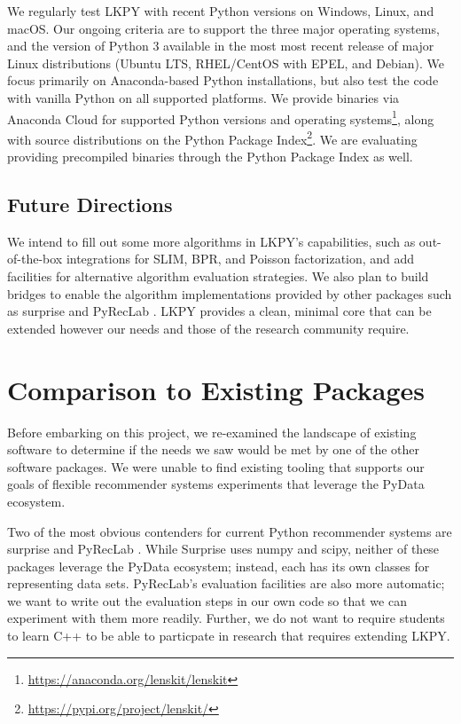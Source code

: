 We regularly test LKPY with recent Python versions on Windows, Linux, and macOS.
Our ongoing criteria are to support the three major operating systems, and the version of Python 3 available in the most most recent release of major Linux distributions (Ubuntu LTS, RHEL/CentOS with EPEL, and Debian).
We focus primarily on Anaconda-based Python installations, but also test the code with vanilla Python on all supported platforms.
We provide binaries via Anaconda Cloud for supported Python versions and operating systems\footnote{\url{https://anaconda.org/lenskit/lenskit}}, along with source distributions on the Python Package Index\footnote{\url{https://pypi.org/project/lenskit/}}.
We are evaluating providing precompiled binaries through the Python Package Index as well.

\subsection{Future Directions}

We intend to fill out some more algorithms in LKPY's capabilities, such as out-of-the-box integrations for SLIM, BPR, and Poisson factorization, and add facilities for alternative algorithm evaluation strategies.
We also plan to build bridges to enable the algorithm implementations provided by other packages such as surprise \citep{Surprise} and PyRecLab \citep{Sepulveda2017-ma}.
LKPY provides a clean, minimal core that can be extended however our needs and those of the research community require.

\section{Comparison to Existing Packages}

Before embarking on this project, we re-examined the landscape of existing software to determine if the needs we saw would be met by one of the other software packages.
We were unable to find existing tooling that supports our goals of flexible recommender systems experiments that leverage the PyData ecosystem.

Two of the most obvious contenders for current Python recommender systems are surprise \citep{Surprise} and PyRecLab \citep{Sepulveda2017-ma}.
While Surprise uses numpy and scipy, neither of these packages leverage the PyData ecosystem; instead, each has its own classes for representing data sets.
PyRecLab's evaluation facilities are also more automatic; we want to write out the evaluation steps in our own code so that we can experiment with them more readily.
Further, we do not want to require students to learn C++ to be able to particpate in research that requires extending LKPY.

